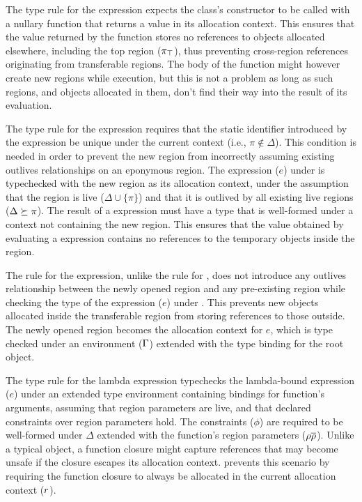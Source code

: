 The type rule for the  expression expects the \RgnZ class's
constructor to be called with a nullary function that returns a value
in its allocation context.  This ensures that the value returned by
the function stores no references to objects allocated elsewhere,
including the top region ($\pi_{\top}$), thus preventing cross-region
references originating from transferable regions. The body of the
function might however create new regions while execution, but this is
not a problem as long as such regions, and objects allocated in them,
don't find their way into the result of its evaluation.

%   

The type rule for the  expression requires that the static
identifier introduced by the expression be unique under the current
context (i.e., $\pi \notin \Delta$). This condition is needed in order
to prevent the new region from incorrectly assuming existing outlives
relationships on an eponymous region. The expression ($e$) under
 is typechecked with the new region as its allocation
context, under the assumption that the region is live ($\Delta \cup
\{\pi\}$) and that it is outlived by all existing live regions
($\Delta \succeq \pi$). The result of a  expression
must have a type that is well-formed under a context not containing
the new region. This ensures that the value obtained by evaluating a
 expression contains no references to the temporary
objects inside the region.

The rule for the  expression, unlike the rule for
, does not introduce any outlives relationship between
the newly opened region and any pre-existing region while checking the
type of the expression ($e$) under . This prevents new objects
allocated inside the transferable region from storing references to
those outside. The newly opened region becomes the allocation context
for $e$, which is type checked under an environment ($\Gamma$) extended
with the type binding for the root object.

The type rule for the lambda expression typechecks the lambda-bound
expression ($e$) under an extended type environment containing
bindings for function's arguments, assuming that region parameters are
live, and that declared constraints over region parameters hold. The
constraints ($\phi$) are required to be well-formed under $\Delta$
extended with the function's region parameters ($\rho\overline{\rho}$).
Unlike a typical object, a function closure might capture references
that may become unsafe if the closure escapes its allocation context.
\FB prevents this scenario by requiring the function closure to always
be allocated in the current allocation context ($r$). 

